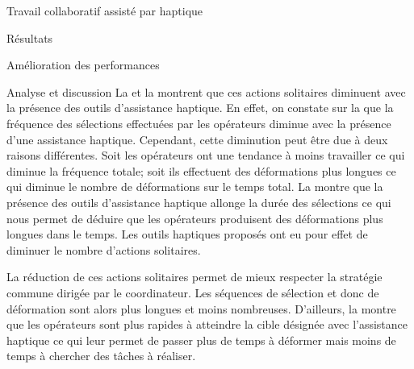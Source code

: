 \documentclass[myfrancais,ngerman,english,french]{mythesis}
\begin{document}
\begin{mychapter}{Travail collaboratif assisté par haptique}
\begin{mysection}{Résultats}
\begin{mysubsection}{Amélioration des performances}
\begin{mysubsubsection}{Analyse et discussion}
					La  et la  montrent que ces actions solitaires diminuent avec la présence des outils d'assistance haptique.
					En effet, on constate sur la  que la fréquence des sélections effectuées par les opérateurs diminue avec la présence d'une assistance haptique.
					Cependant, cette diminution peut être due à deux raisons différentes.
					Soit les opérateurs ont une tendance à moins travailler ce qui diminue la fréquence totale; soit ils effectuent des déformations plus longues ce qui diminue le nombre de déformations sur le temps total.
					La  montre que la présence des outils d'assistance haptique allonge la durée des sélections ce qui nous permet de déduire que les opérateurs produisent des déformations plus longues dans le temps.
					Les outils haptiques proposés ont eu pour effet de diminuer le nombre d'actions solitaires.

					La réduction de ces actions solitaires permet de mieux respecter la stratégie commune dirigée par le coordinateur.
					Les séquences de sélection et donc de déformation sont alors plus longues et moins nombreuses.
					D'ailleurs, la  montre que les opérateurs sont plus rapides à atteindre la cible désignée avec l'assistance haptique ce qui leur permet de passer plus de temps à déformer mais moins de temps à chercher des tâches à réaliser.


\end{mysubsubsection}
\end{mysubsection}
\end{mysection}
\end{mychapter}
\end{document}
